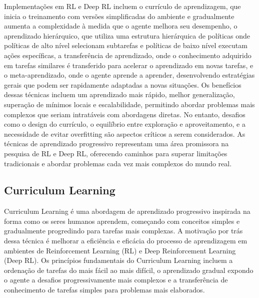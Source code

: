 Implementações em RL e Deep RL incluem o currículo de aprendizagem, que inicia o treinamento com versões simplificadas do ambiente e gradualmente aumenta a complexidade à medida que o agente melhora seu desempenho, o aprendizado hierárquico, que utiliza uma estrutura hierárquica de políticas onde políticas de alto nível selecionam subtarefas e políticas de baixo nível executam ações específicas, a transferência de aprendizado, onde o conhecimento adquirido em tarefas similares é transferido para acelerar o aprendizado em novas tarefas, e o meta-aprendizado, onde o agente aprende a aprender, desenvolvendo estratégias gerais que podem ser rapidamente adaptadas a novas situações. Os benefícios dessas técnicas incluem um aprendizado mais rápido, melhor generalização, superação de mínimos locais e escalabilidade, permitindo abordar problemas mais complexos que seriam intratáveis com abordagens diretas. No entanto, desafios como o design do currículo, o equilíbrio entre exploração e aproveitamento, e a necessidade de evitar overfitting são aspectos críticos a serem considerados. As técnicas de aprendizado progressivo representam uma área promissora na pesquisa de RL e Deep RL, oferecendo caminhos para superar limitações tradicionais e abordar problemas cada vez mais complexos do mundo real\cite{https://www.semanticscholar.org/paper/3004b3eba73f4def2d36d2064eadc76c5244547d,https://www.semanticscholar.org/paper/f11594e47ce3f5872bd4d4868f23655025bb6511,https://www.semanticscholar.org/paper/b30e72c8f236951fe26024bfe49bda84e8bf133b,https://www.semanticscholar.org/paper/c984fdd5f847e46a9335c5aba982d31ceafbcb27,https://www.semanticscholar.org/paper/ece55442b2aee7f9db67c7fc58a6a857ed915fcd,https://www.semanticscholar.org/paper/801d0ef8c81c13a64228720b7d43660dcf664705,https://www.semanticscholar.org/paper/68fb81aa0a7d17ff07cb4c8d74cb78f0e67bbcca,https://www.semanticscholar.org/paper/1a4a43a3997e2694b6ce91ba33ebade1269a6256,https://www.semanticscholar.org/paper/67dd6e219a02aeb8f151eec2d8254e30cf7599dd}.

\subsection{Curriculum Learning}
\label{subsec:curriculum}

Curriculum Learning é uma abordagem de aprendizado progressivo inspirada na forma como os seres humanos aprendem, começando com conceitos simples e gradualmente progredindo para tarefas mais complexas. A motivação por trás dessa técnica é melhorar a eficiência e eficácia do processo de aprendizagem em ambientes de Reinforcement Learning (RL) e Deep Reinforcement Learning (Deep RL). Os princípios fundamentais do Curriculum Learning incluem a ordenação de tarefas do mais fácil ao mais difícil, o aprendizado gradual expondo o agente a desafios progressivamente mais complexos e a transferência de conhecimento de tarefas simples para problemas mais elaborados.


